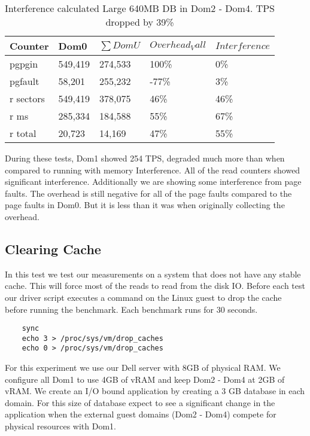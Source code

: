 \begin{table}[h]
\begin{tabular}{ l l l l p{5cm} }
  Counter & Dom0 & $\sum{DomU}$ & $Overhead_Vall$ & $Interference$ \\
  \hline
	pgpgin    & 549,419 & 274,533 & 100\% &   0\% \\
	pgfault   &  58,201 & 255,232 & -77\% &   3\% \\
	r sectors & 549,419 & 378,075 &  46\% &  46\% \\
	r ms      & 285,334 & 184,588 &  55\% &  67\% \\
	r total   &  20,723 &  14,169 &  47\% &  55\% \\
  \hline
\end{tabular}
\caption{Interference calculated Large 640MB DB in Dom2 - Dom4.  TPS dropped by 39\%}
\label{fig:InterferenceLg}
\end{table}

During these tests, Dom1 showed 254 TPS, degraded much more than when compared to running with memory Interference.  All of the read counters showed significant interference.  Additionally we are showing some interference from page faults.  The overhead is still negative for all of the page faults compared to the page faults in Dom0.  But it is less than it was when originally collecting the overhead.


\subsection{Clearing Cache}
In this test we test our measurements on a system that does not have any stable cache. This will force most of
the reads to read from the disk IO. Before each test our driver script executes a command on the Linux guest
to drop the cache before running the benchmark. Each benchmark runs for 30 seconds.

\begin{Verbatim}
    sync
    echo 3 > /proc/sys/vm/drop_caches
    echo 0 > /proc/sys/vm/drop_caches
\end{Verbatim}

\indent For this experiment we use our Dell server with 8GB of physical RAM. We configure all Dom1 to use
4GB of vRAM and keep Dom2 - Dom4 at 2GB of vRAM. We create an I/O bound application by creating a
3 GB database in each domain. For this size of database expect to see a significant change in the application
when the external guest domains (Dom2 - Dom4) compete for physical resources with Dom1.

